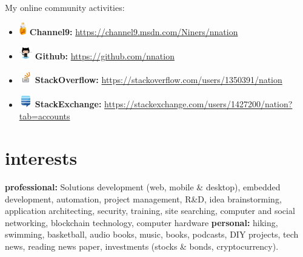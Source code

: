 \documentclass[]{friggeri-cvRS}
\begin{document}
My online community activities:
\begin{itemize}[noitemsep]
	\item[] \includegraphics[height=16pt]{images/ch9Icon.png} \textbf{Channel9: }\href{https://channel9.msdn.com/Niners/nnation}{https://channel9.msdn.com/Niners/nnation}
	\item[] \includegraphics[height=16pt]{images/octocat.png} \textbf{Github: }\href{https://github.com/nnation}{https://github.com/nnation}
	\item[] \includegraphics[height=16pt]{images/stackoverflow.png} \textbf{StackOverflow: }\href{https://stackoverflow.com/users/1350391/nation}{https://stackoverflow.com/users/1350391/nation}
	\item[] \includegraphics[height=16pt]{images/stackexchange.png} \textbf{StackExchange: } \href {https://stackexchange.com/users/1427200/nation?tab=accounts}{https://stackexchange.com/users/1427200/nation?tab=accounts}
\end{itemize}


\section{interests}

\textbf{professional:} Solutions development (web, mobile \& desktop), embedded development, automation, project management, R\&D, idea brainstorming, application architecting, security, training, site searching, computer and social networking, blockchain technology, computer hardware
\textbf{personal:} hiking, swimming, basketball, audio books, music, books, podcasts, DIY projects, tech news, reading news paper, investments (stocks \& bonds, cryptocurrency).
\end{document}
